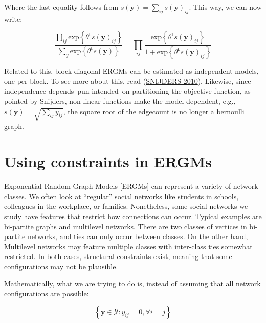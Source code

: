 \documentclass[
]{book}
\begin{document}
Where the last equality follows from \(s\left(\mathbf{y}\right) = \sum_{ij}{s\left(\mathbf{y}\right)_{ij}}\). This way, we can now write:

\begin{equation}
\frac{\prod_{ij}\mbox{exp}\left\{{\theta}^\mathbf{t}s\left(\mathbf{y}\right)_{ij}\right\}}{\sum_{y}\mbox{exp}\left\{{\theta}^\mathbf{t}s\left(\mathbf{y}\right)\right\}} = 
\prod_{ij}\frac{\mbox{exp}\left\{{\theta}^\mathbf{t}s\left(\mathbf{y}\right)_{ij}\right\}}{1 + \mbox{exp}\left\{{\theta}^\mathbf{t}s\left(\mathbf{y}\right)_{ij}\right\}}
\end{equation}

Related to this, block-diagonal ERGMs can be estimated as independent models, one per block. To see more about this, read (\protect\hyperlink{ref-Snijders2010margin}{SNIJDERS 2010}). Likewise, since independence depends--pun intended--on partitioning the objective function, as pointed by Snijders, non-linear functions make the model dependent, e.g., \(s\left(\mathbf{y}\right) = \sqrt{\sum_{ij}y_{ij}}\), the square root of the edgecount is no longer a bernoulli graph.

\renewcommand{\Pr}[1]{\mathbb{P}{#1}}

\hypertarget{using-constraints-in-ergms}{%
\chapter{Using constraints in ERGMs}\label{using-constraints-in-ergms}}

Exponential Random Graph Models {[}ERGMs{]} can represent a variety of network classes. We often look at ``regular'' social networks like students in schools, colleagues in the workplace, or families. Nonetheless, some social networks we study have features that restrict how connections can occur. Typical examples are \href{https://en.wikipedia.org/wiki/Bipartite_graph}{bi-partite graphs} and \href{https://cran.r-project.org/web/packages/mlergm/vignettes/mlergm_tutorial.html}{multilevel networks}. There are two classes of vertices in bi-partite networks, and ties can only occur between classes. On the other hand, Multilevel networks may feature multiple classes with inter-class ties somewhat restricted. In both cases, structural constraints exist, meaning that some configurations may not be plausible.

Mathematically, what we are trying to do is, instead of assuming that all network configurations are possible:

\[
\left\{\mathbf{y} \in \mathcal{Y}: y_{ij} = 0, \forall i = j\right\}
\]
\end{document}
